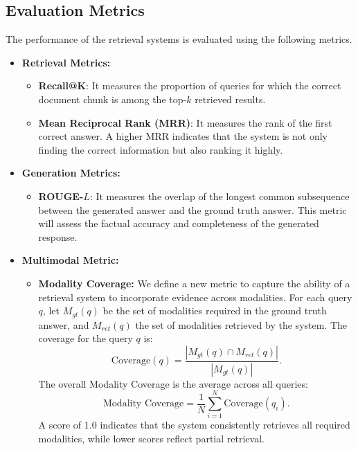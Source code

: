 \documentclass{svproc}
\begin{document}
\subsection{Evaluation Metrics}
The performance of the retrieval systems is evaluated using the following metrics.
\begin{itemize}
 \item \textbf{Retrieval Metrics:}
\begin{itemize}
    \item \textbf{Recall@K}: It measures the proportion of queries for which the correct document chunk is among the top-$k$ retrieved results.
    \item \textbf{Mean Reciprocal Rank (MRR)}: It measures the rank of the first correct answer. A higher MRR indicates that the system is not only finding the correct information but also ranking it highly.
\end{itemize}
\item \textbf{Generation Metrics:}
\begin{itemize}
    \item \textbf{ROUGE-$L$}: It measures the overlap of the longest common subsequence between the generated answer and the ground truth answer. This metric will assess the factual accuracy and completeness of the generated response.
\end{itemize}
\item \textbf{Multimodal Metric:}
\begin{itemize}
    \label{reference: modality-coverage}
    \item \textbf{Modality Coverage:} We define a new metric to capture the ability of a retrieval system to incorporate evidence across modalities. For each query $q$, let $M_{gt}(q)$ be the set of modalities required in the ground truth answer, and $M_{ret}(q)$ the set of modalities retrieved by the system. The coverage for the query $q$ is:
    \[
    \text{Coverage}(q) = \frac{|M_{gt}(q) \cap M_{ret}(q)|}{|M_{gt}(q)|}.
    \]
    The overall Modality Coverage is the average across all queries:
    \[
    \text{Modality Coverage} = \frac{1}{N} \sum_{i=1}^{N} \text{Coverage}(q_i).
    \]
    A score of $1.0$ indicates that the system consistently retrieves all required modalities, while lower scores reflect partial retrieval.
\end{itemize}
\end{itemize}
\end{document}

